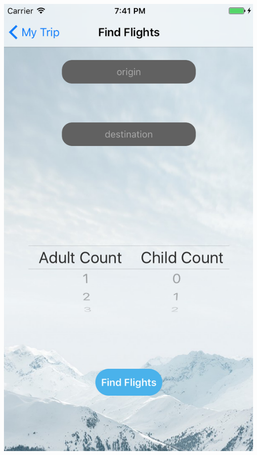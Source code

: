 \documentclass{beamer}
\begin{document}
\begin{frame}
\begin{columns}
\begin{column}{0.3\textwidth}
        \begin{center}
            \includegraphics[scale=0.3]{flightSearch}
        \end{center}
    \end{column}
\end{columns}
\end{frame}
\end{document}
